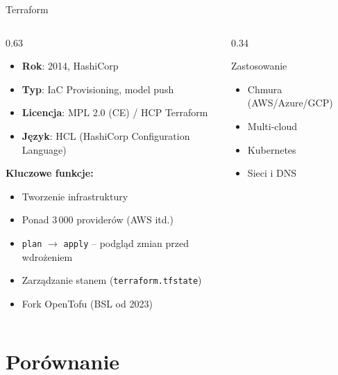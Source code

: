 \documentclass{beamer}
\begin{document}
\begin{frame}{Terraform}
    \begin{columns}[T]
        \begin{column}{0.63\textwidth}
            \begin{itemize}
                \item \textbf{Rok}: 2014, HashiCorp
                \item \textbf{Typ}: IaC Provisioning, model push
                \item \textbf{Licencja}: MPL 2.0 (CE) / HCP Terraform
                \item \textbf{J\k{e}zyk}: HCL (HashiCorp Configuration Language)
            \end{itemize}
            \vspace{0.4em}
            \textbf{Kluczowe funkcje:}
            \begin{itemize}
                \item Tworzenie infrastruktury
                \item Ponad 3\,000 provider\'ow (AWS itd.)
                \item \texttt{plan} $\rightarrow$ \texttt{apply} -- podgl\k{a}d zmian przed wdro\.zeniem
                \item Zarz\k{a}dzanie stanem (\texttt{terraform.tfstate})
                \item Fork OpenTofu (BSL od 2023)
            \end{itemize}
        \end{column}
        \begin{column}{0.34\textwidth}
            \begin{block}{Zastosowanie}
                \begin{itemize}
                    \item Chmura (AWS/Azure/GCP)
                    \item Multi-cloud
                    \item Kubernetes
                    \item Sieci i DNS
                \end{itemize}
            \end{block}
        \end{column}
    \end{columns}
\end{frame}

\section{Por\'ownanie}
\end{document}
